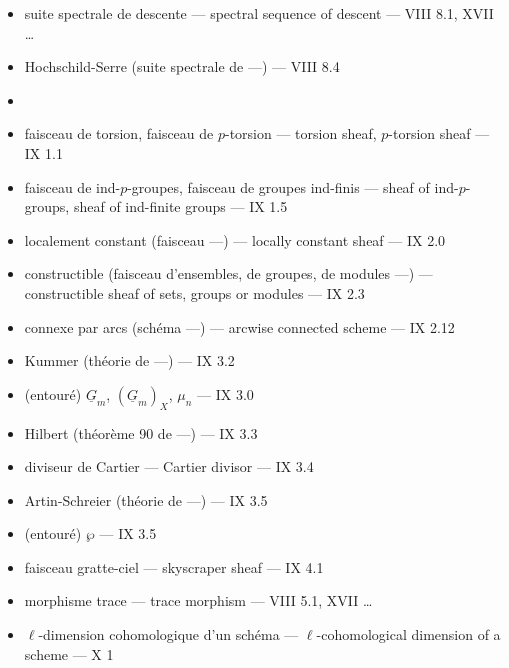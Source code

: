\documentclass[11pt,a4paper]{article}
\begin{document}
\begin{itemize}
\item suite spectrale de descente --- spectral sequence of descent --- VIII 8.1,
XVII \ldots\ \marginal{$*$}
\item Hochschild-Serre (suite spectrale de ---) --- VIII 8.4
\item {}
\item faisceau de torsion, faisceau de $p$-torsion --- torsion sheaf, $p$-torsion
sheaf --- IX 1.1
\item faisceau de ind-$p$-groupes, faisceau de groupes ind-finis --- sheaf of
ind-$p$-groups, sheaf of ind-finite groups --- IX 1.5
\item localement constant (faisceau ---) --- locally constant sheaf --- IX 2.0
\item constructible (faisceau d'ensembles, de groupes, de modules ---) ---
constructible \struck{\ill{}} sheaf of sets, groups or modules --- IX 2.3
\item connexe par arcs (schéma ---) --- arcwise connected scheme --- IX 2.12
\item Kummer (théorie de ---) --- IX 3.2
\item (entouré) $\underline{G}_m$, $(\underline{G}_m)_X$, $\mu_n$ --- IX 3.0
\item Hilbert (théorème 90 de ---) --- IX 3.3
\item diviseur de Cartier --- Cartier divisor --- IX 3.4
\item Artin-Schreier (théorie de ---) --- IX 3.5
\item (entouré) $\wp$ --- IX 3.5
\item faisceau gratte-ciel --- skyscraper sheaf --- IX 4.1
\item morphisme trace --- trace morphism --- VIII 5.1, XVII \ldots
\item $\ell$-dimension cohomologique d'un schéma --- $\ell$-cohomological
dimension of a scheme --- X 1
\end{itemize}
\end{document}
